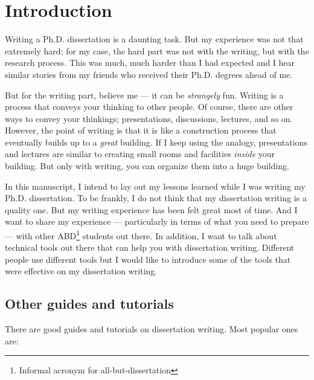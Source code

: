 \documentclass[11pt]{article}
\begin{document}
\section{Introduction}

Writing a Ph.D. dissertation is a daunting task. But my experience was not
that extremely hard; for my case, the hard part was not with the writing, but
with the research process. This was much, much harder than I had expected 
and I hear similar stories from my friends who received their Ph.D. degrees ahead
of me.

But for the writing part, believe me --- it can be \emph{strangely} fun.
Writing is a process that conveys your thinking to other people.  Of course,
there are other ways to convey your thinkings; presentations, discussions,
lectures, and so on.  However, the point of writing is that it is like a
construction process that eventually builds up to a \emph{great} building.  If
I keep using the analogy, presentations and lectures are similar to creating
small rooms and facilities \emph{inside} your building. But only with writing,
you can organize them into a huge building.

In this manuscript, I intend to lay out my lessons learned while I was writing
my Ph.D. dissertation. To be frankly, I do not think that my dissertation
writing is a quality one. But my writing experience has been felt great most
of time. And I want to share my experience --- particularly in terms of what
you need to prepare --- with other ABD\footnote{Informal acronym for
all-but-dissertation} students out there. In addition, I want to talk about
technical tools out there that can help you with dissertation writing.
Different people use different tools but I would like to introduce some of the
tools that were effective on my dissertation writing. 

\subsection{Other guides and tutorials}
There are good guides and tutorials on dissertation writing. Most popular ones are:
\end{document}
